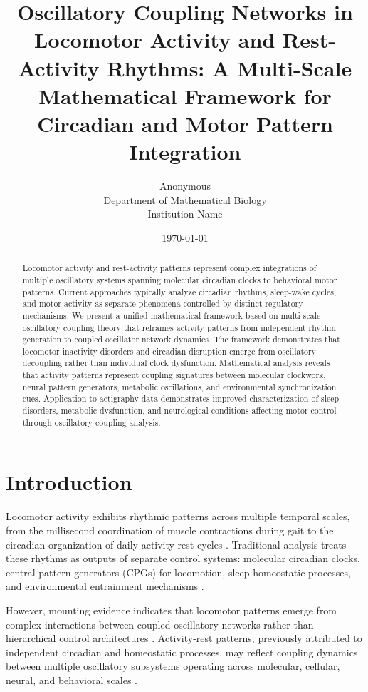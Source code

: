 \documentclass[twocolumn]{article}
\title{Oscillatory Coupling Networks in Locomotor Activity and Rest-Activity Rhythms: A Multi-Scale Mathematical Framework for Circadian and Motor Pattern Integration}
\author{
Anonymous\\
Department of Mathematical Biology\\
Institution Name
}
\date{\today}
\begin{document}
\maketitle

\begin{abstract}
Locomotor activity and rest-activity patterns represent complex integrations of multiple oscillatory systems spanning molecular circadian clocks to behavioral motor patterns. Current approaches typically analyze circadian rhythms, sleep-wake cycles, and motor activity as separate phenomena controlled by distinct regulatory mechanisms. We present a unified mathematical framework based on multi-scale oscillatory coupling theory that reframes activity patterns from independent rhythm generation to coupled oscillator network dynamics. The framework demonstrates that locomotor inactivity disorders and circadian disruption emerge from oscillatory decoupling rather than individual clock dysfunction. Mathematical analysis reveals that activity patterns represent coupling signatures between molecular clockwork, neural pattern generators, metabolic oscillations, and environmental synchronization cues. Application to actigraphy data demonstrates improved characterization of sleep disorders, metabolic dysfunction, and neurological conditions affecting motor control through oscillatory coupling analysis.
\end{abstract}

\section{Introduction}

Locomotor activity exhibits rhythmic patterns across multiple temporal scales, from the millisecond coordination of muscle contractions during gait to the circadian organization of daily activity-rest cycles \citep{roenneberg2003life,foster2020circadian}. Traditional analysis treats these rhythms as outputs of separate control systems: molecular circadian clocks, central pattern generators (CPGs) for locomotion, sleep homeostatic processes, and environmental entrainment mechanisms \citep{takahashi2017transcriptional,grillner2003central}.

However, mounting evidence indicates that locomotor patterns emerge from complex interactions between coupled oscillatory networks rather than hierarchical control architectures \citep{glass2001synchronization,refinetti2006circadian}. Activity-rest patterns, previously attributed to independent circadian and homeostatic processes, may reflect coupling dynamics between multiple oscillatory subsystems operating across molecular, cellular, neural, and behavioral scales \citep{roenneberg2007plasticity}.
\end{document}

